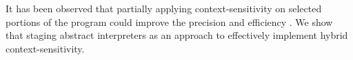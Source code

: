 It has been observed that partially applying context-sensitivity on selected
portions of the program could improve the precision and efficiency
\cite{zipper2018, Kastrinis:2013:HCP:2491956.2462191}. We show that staging
abstract interpreters as an approach to effectively implement hybrid
context-sensitivity\todo{}.
\fi

